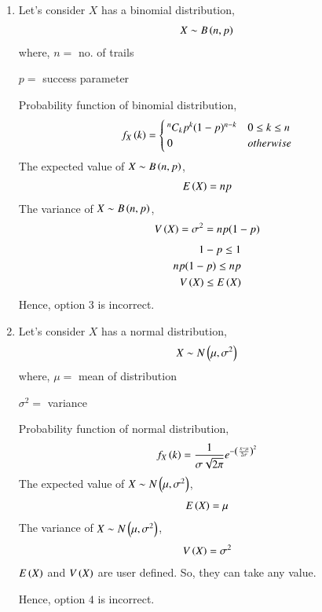 \documentclass[journal,12pt,twocolumn]{IEEEtran}
\begin{document}
\begin{enumerate}
    \item Let's consider $X$ has a binomial distribution,
    \begin{align}
        X \sim B\left(n,p\right)
    \end{align}
    where,
    $n=$ no. of trails
    
    $p=$ success parameter
    
    Probability function of binomial distribution,
    \begin{align}
        f_X\left(k\right)=
        \begin{cases}
            {^n C_k}p^k(1-p)^{n-k} & 0\leq k\leq n\\
            0 & otherwise
        \end{cases}
    \end{align}
    The expected value of $X \sim B\left(n,p\right)$,
    \begin{align}
        E\left(X\right)=np
    \end{align}
    The variance of $X \sim B\left(n,p\right)$,
    \begin{align}
        V\left(X\right)=\sigma^2=n p(1-p)
    \end{align}
    \begin{align}
        1-p\leq1\\
        n p(1-p)\leq n p\\
        V\left(X\right)\leq E\left(X\right)
    \end{align}
    Hence, option $3$ is incorrect.
    
    \item Let's consider $X$ has a normal distribution,
    \begin{align}
        X \sim N\left(\mu,\sigma^2\right)
    \end{align}
    where,
    $\mu=$ mean of distribution
    
    $\sigma^2=$ variance
    
    Probability function of normal distribution,
    \begin{align}
        f_X\left(k\right)=\frac{1}{\sigma\sqrt{2\pi}}e^{-\left(\frac{x-\mu}{2\sigma}\right)^2}
    \end{align}
    The expected value of $X \sim N\left(\mu,\sigma^2\right)$,
    \begin{align}
        E\left(X\right)=\mu
    \end{align}
    The variance of $X \sim N\left(\mu,\sigma^2\right)$,
    \begin{align}
        V\left(X\right)=\sigma^2
    \end{align}
    $E\left(X\right)$ and $V\left(X\right)$ are user defined. So, they can take any value.
    
    Hence, option $4$ is incorrect.
\end{enumerate}
\end{document}
